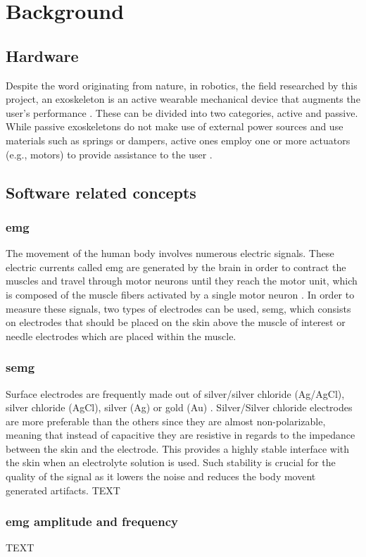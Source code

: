 \section{Background}
\label{section:background}

\subsection{Hardware}

Despite the word originating from nature, in robotics, the field researched by this project, an exoskeleton is an active wearable 
mechanical device that augments the user's performance \cite{exodefinition}. These can be divided into two categories, active and passive. 
While passive exoskeletons do not make use of external power sources and use materials such as springs or dampers, active ones employ 
one or more actuators (e.g., motors) to provide assistance to the user \cite{passiveactiveexo}.


\subsection{Software related concepts}

\subsubsection{\acf{emg}}

The movement of the human body involves numerous electric signals. These electric currents called \ac{emg} are generated by the brain
in order to contract the muscles and travel through motor neurons until they reach the motor unit, which is composed of the muscle fibers
activated by a single motor neuron \cite{emggen}. In order to measure these signals, two types of electrodes can be used, \ac{semg}, 
which consists on electrodes that should be placed on the skin above the muscle of interest or needle electrodes which are placed within 
the muscle. 

\subsubsection{\acf{semg}}

Surface electrodes are frequently made out of silver/silver chloride (Ag/AgCl), silver chloride (AgCl), silver (Ag) or gold (Au) \cite{sEMG}.
Silver/Silver chloride electrodes are more preferable than the others since they are almost non-polarizable, meaning that instead of capacitive
they are resistive in regards to the impedance between the skin and the electrode. This provides a highly stable interface with the skin when 
an electrolyte solution is used. Such stability is crucial for the quality of the signal as it lowers the noise and reduces the body movent generated
artifacts.
TEXT

\subsubsection{\acs{emg} amplitude and frequency}

TEXT

